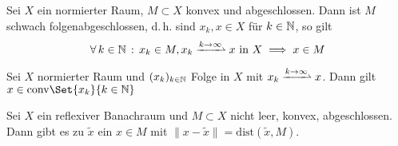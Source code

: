 \documentclass{cheat-sheet}
\newcommand{\K}{\mathbb{K}}
\newcommand{\convWeaklyWith}[1]{\xrightharpoonup{#1 \to \infty}} %
\begin{document}
\begin{satz}
  Sei $X$ ein normierter Raum, $M \subset X$ konvex und abgeschlossen. Dann ist $M$ schwach folgenabgeschlossen, d.\,h. sind $x_k, x \in X$ für $k \in \mathbb{N}$, so gilt
  \[ \forall \, k \in \N \,:\, x_k \in M, x_k \convWeaklyWith{k} x \text{ in } X \implies x \in M \]
\end{satz}

\begin{lem}[Mazur]
  Sei $X$ normierter Raum und $(x_k)_{k \in \mathbb{N}}$ Folge in $X$ mit $x_k \convWeaklyWith{k} x$. Dann gilt $x \in \mathrm{conv} \Set{ x_k }{ k \in \N }$
\end{lem}

\begin{satz}
  Sei $X$ ein reflexiver Banachraum und $M \subset X$ nicht leer, konvex, abgeschlossen. Dann gibt es zu $\tilde{x}$ ein $x \in M$ mit $\| x - \tilde{x} \| = \mathrm{dist}(\tilde{x}, M)$.
\end{satz}



\end{document}
